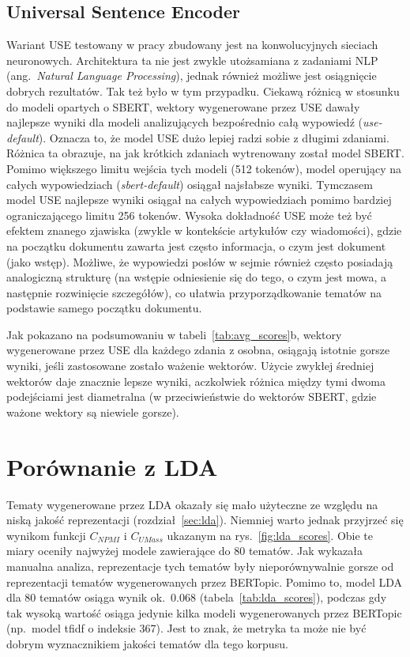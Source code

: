 	\subsection{Universal Sentence Encoder}
		Wariant USE testowany w pracy zbudowany jest na konwolucyjnych sieciach neuronowych.
		Architektura ta nie jest zwykle utożsamiana z zadaniami NLP (ang.\ \emph{Natural Language Processing}), jednak również możliwe jest osiągnięcie dobrych rezultatów.
		Tak też było w tym przypadku.
		Ciekawą różnicą w stosunku do modeli opartych o SBERT, wektory wygenerowane przez USE dawały najlepsze wyniki dla modeli analizujących bezpośrednio całą wypowiedź (\emph{use-default}).
		Oznacza to, że model USE dużo lepiej radzi sobie z długimi zdaniami.
		Różnica ta obrazuje, na jak krótkich zdaniach wytrenowany został model SBERT\@.
		Pomimo większego limitu wejścia tych modeli (512 tokenów), model operujący na całych wypowiedziach (\emph{sbert-default}) osiągał najsłabsze wyniki.
		Tymczasem model USE najlepsze wyniki osiągał na całych wypowiedziach pomimo bardziej ograniczającego limitu 256 tokenów.
		Wysoka dokładność USE może też być efektem znanego zjawiska (zwykle w kontekście artykułów czy wiadomości),
			gdzie na początku dokumentu zawarta jest często informacja, o czym jest dokument (jako wstęp).
		Możliwe, że wypowiedzi posłów w sejmie również często posiadają analogiczną strukturę
			(na wstępie odniesienie się do tego, o czym jest mowa, a następnie rozwinięcie szczegółów), co ułatwia przyporządkowanie tematów na podstawie samego początku dokumentu.

		Jak pokazano na podsumowaniu w tabeli~\ref{tab:avg_scores}b, wektory wygenerowane przez USE dla każdego zdania z osobna, osiągają istotnie gorsze wyniki,
			jeśli zastosowane zostało ważenie wektorów.
		Użycie zwykłej średniej wektorów daje znacznie lepsze wyniki, aczkolwiek różnica między tymi dwoma podejściami jest diametralna
			(w przeciwieństwie do wektorów SBERT, gdzie ważone wektory są niewiele gorsze).
	
\section{Porównanie z LDA}
	Tematy wygenerowane przez LDA okazały się mało użyteczne ze względu na niską jakość reprezentacji (rozdział~\ref{sec:lda}).
	Niemniej warto jednak przyjrzeć się wynikom funkcji \(C_{NPMI}\) i \(C_{UMass}\) ukazanym na rys.~\ref{fig:lda_scores}.
	Obie te miary oceniły najwyżej modele zawierające do 80 tematów.
	Jak wykazała manualna analiza, reprezentacje tych tematów były nieporównywalnie gorsze od reprezentacji tematów wygenerowanych przez BERTopic.
	Pomimo to, model LDA dla 80 tematów osiąga wynik ok.~0.068 (tabela~\ref{tab:lda_scores}),
		podczas gdy tak wysoką wartość osiąga jedynie kilka modeli wygenerowanych przez BERTopic (np.~model tfidf o indeksie 367).
	Jest to znak, że metryka ta może nie być dobrym wyznacznikiem jakości tematów dla tego korpusu.

